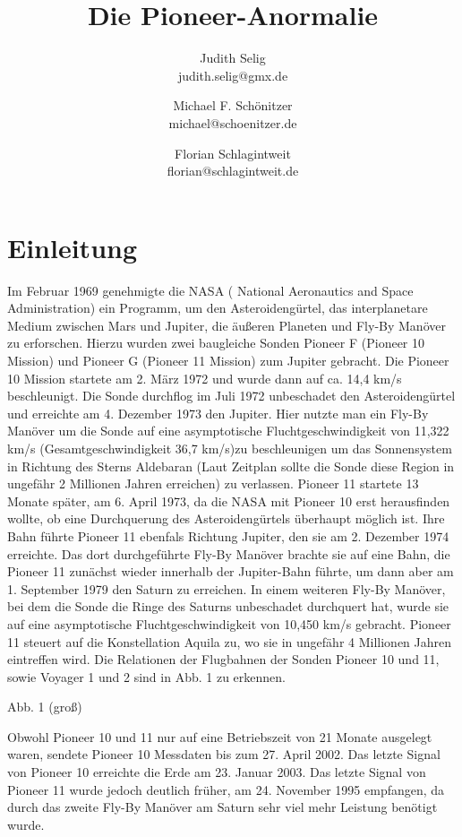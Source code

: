 \documentclass[a4paper,10pt]{article}
\title{Die Pioneer-Anormalie}
\author{Judith Selig\\judith.selig@gmx.de \and Michael F. Schönitzer\\michael@schoenitzer.de \and Florian Schlagintweit\\florian@schlagintweit.de}	%
\begin{document}
\maketitle

% 

\section{Einleitung}
Im Februar 1969 genehmigte die NASA ( National Aeronautics and Space Administration) ein Programm, um den
Asteroidengürtel, das interplanetare Medium zwischen Mars und Jupiter, die äußeren Planeten und Fly-By Manöver zu
erforschen. Hierzu wurden zwei baugleiche Sonden Pioneer F (Pioneer 10 Mission) und Pioneer G (Pioneer 11 Mission) zum
Jupiter gebracht. Die Pioneer 10 Mission startete am 2. März 1972 und wurde dann auf ca. 14,4 km/s beschleunigt. Die
Sonde durchflog im Juli 1972 unbeschadet den Asteroidengürtel und erreichte am 4. Dezember 1973 den Jupiter. Hier nutzte
man ein Fly-By Manöver um die Sonde auf eine asymptotische Fluchtgeschwindigkeit von 11,322 km/s (Gesamtgeschwindigkeit
36,7 km/s)zu beschleunigen um das Sonnensystem in Richtung des Sterns Aldebaran (Laut Zeitplan sollte die Sonde diese
Region in ungefähr 2 Millionen Jahren erreichen\cite{Nieto2004}) zu verlassen. Pioneer 11 startete 13 Monate später, am
6. April 1973, da die NASA mit Pioneer 10 erst herausfinden wollte, ob eine Durchquerung des Asteroidengürtels überhaupt
möglich ist. Ihre Bahn führte Pioneer 11 ebenfals Richtung Jupiter, den sie am 2. Dezember 1974 erreichte. Das dort
durchgeführte Fly-By Manöver brachte sie auf eine Bahn, die Pioneer 11 zunächst wieder innerhalb der Jupiter-Bahn
führte, um dann aber am 1. September 1979 den Saturn zu erreichen. In einem weiteren Fly-By Manöver, bei dem die Sonde
die Ringe des Saturns unbeschadet durchquert hat, wurde sie auf eine asymptotische Fluchtgeschwindigkeit von 10,450 km/s
gebracht. Pioneer 11 steuert auf die Konstellation Aquila zu, wo sie in ungefähr 4 Millionen Jahren eintreffen wird. Die
Relationen der Flugbahnen der Sonden Pioneer 10 und 11, sowie Voyager 1 und 2 sind in Abb. 1 zu erkennen.

Abb. 1 (groß)

Obwohl Pioneer 10 und 11 nur auf eine Betriebszeit von 21 Monate ausgelegt waren, sendete Pioneer 10 Messdaten bis zum
27. April 2002. Das letzte Signal von Pioneer 10 erreichte die Erde am 23. Januar 2003. Das letzte Signal von Pioneer 11
wurde jedoch deutlich früher, am 24. November 1995 empfangen, da durch das zweite Fly-By Manöver am Saturn sehr viel
mehr Leistung benötigt wurde.
\end{document}
